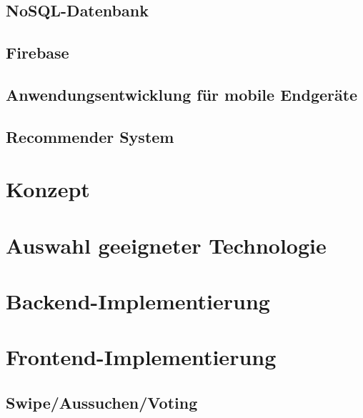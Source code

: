 \documentclass[11pt,a4paper]{article}
\begin{document}
\subsection{NoSQL-Datenbank}

\subsection{Firebase}

\subsection{Anwendungsentwicklung für mobile Endgeräte}

\subsection{Recommender System}

\clearpage

\section{Konzept}

\clearpage


\section{Auswahl geeigneter Technologie}

\clearpage

\newpage
\section{Backend-Implementierung}


\newpage
\section{Frontend-Implementierung}
\subsection{Swipe/Aussuchen/Voting}		
\end{document}
